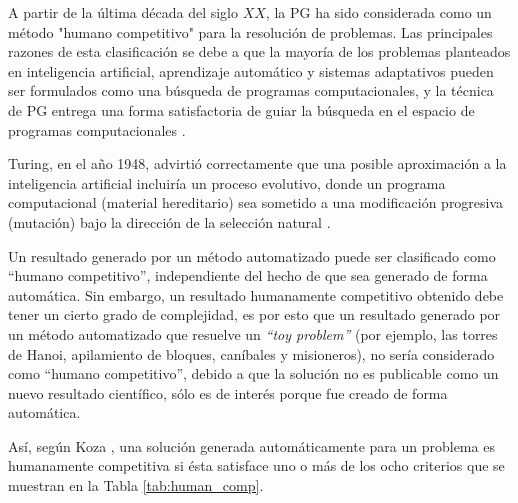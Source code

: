 A partir de la última década del siglo $XX$, la PG ha sido considerada como un método "humano competitivo" para la resolución de problemas. Las principales razones de esta clasificación se debe a que la mayoría de los problemas planteados en inteligencia artificial, aprendizaje automático y sistemas adaptativos pueden ser formulados como una búsqueda de programas computacionales, y la técnica de PG entrega una forma satisfactoria de guiar la búsqueda en el espacio de programas computacionales \citep{affenzeller_2001}.

Turing, en el año 1948, advirtió correctamente que una posible aproximación a la inteligencia artificial incluiría un proceso evolutivo, donde un programa computacional (material hereditario) sea sometido a una modificación progresiva (mutación) bajo la dirección de la selección natural \citep{koza_poli_2005}.

Un resultado generado por un método automatizado puede ser clasificado como “humano competitivo”, independiente del hecho de que sea generado de forma automática. Sin embargo, un resultado humanamente competitivo obtenido debe tener un cierto grado de complejidad, es por esto que un resultado generado por un método automatizado que resuelve un \textit{“toy problem”} (por ejemplo, las torres de Hanoi, apilamiento de bloques, caníbales y misioneros), no sería considerado como “humano competitivo”, debido a que la solución no es publicable como un nuevo resultado científico, sólo es de interés porque fue creado de forma automática.

Así, según Koza \citep{koza_2003}, una solución generada automáticamente para un problema es humanamente competitiva si ésta satisface uno o más de los ocho criterios que se muestran en la Tabla \ref{tab:human_comp}.

